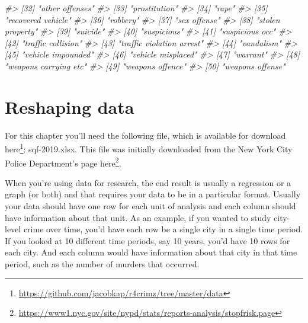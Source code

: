 \documentclass[
]{krantz}
\makeatletter
\newenvironment{Shaded}{\begin{snugshade}}{\end{snugshade}}
\newcommand{\CommentTok}[1]{\textcolor[rgb]{0.37,0.37,0.37}{\textit{#1}}}
\renewcommand{\href}[2]{#2\footnote{\url{#1}}}
\newenvironment{kframe}{%
\medskip{}
\setlength{\fboxsep}{.8em}
 \def\at@end@of@kframe{}%
 \ifinner\ifhmode%
  \def\at@end@of@kframe{\end{minipage}}%
  \begin{minipage}{\columnwidth}%
 \fi\fi%
 \def\FrameCommand##1{\hskip\@totalleftmargin \hskip-\fboxsep
 \colorbox{shadecolor}{##1}\hskip-\fboxsep
     \hskip-\linewidth \hskip-\@totalleftmargin \hskip\columnwidth}%
 \MakeFramed {\advance\hsize-\width
   \@totalleftmargin\z@ \linewidth\hsize
   \@setminipage}}%
 {\par\unskip\endMakeFramed%
 \at@end@of@kframe}
\renewenvironment{Shaded}{\begin{kframe}}{\end{kframe}}
\makeatother
\begin{document}
\begin{Shaded}
\begin{Highlighting}[]
\CommentTok{\#\textgreater{} [32] "other offenses"                            }
\CommentTok{\#\textgreater{} [33] "prostitution"                              }
\CommentTok{\#\textgreater{} [34] "rape"                                      }
\CommentTok{\#\textgreater{} [35] "recovered vehicle"                         }
\CommentTok{\#\textgreater{} [36] "robbery"                                   }
\CommentTok{\#\textgreater{} [37] "sex offense"                               }
\CommentTok{\#\textgreater{} [38] "stolen property"                           }
\CommentTok{\#\textgreater{} [39] "suicide"                                   }
\CommentTok{\#\textgreater{} [40] "suspicious"                                }
\CommentTok{\#\textgreater{} [41] "suspicious occ"                            }
\CommentTok{\#\textgreater{} [42] "traffic collision"                         }
\CommentTok{\#\textgreater{} [43] "traffic violation arrest"                  }
\CommentTok{\#\textgreater{} [44] "vandalism"                                 }
\CommentTok{\#\textgreater{} [45] "vehicle impounded"                         }
\CommentTok{\#\textgreater{} [46] "vehicle misplaced"                         }
\CommentTok{\#\textgreater{} [47] "warrant"                                   }
\CommentTok{\#\textgreater{} [48] "weapons carrying etc"                      }
\CommentTok{\#\textgreater{} [49] "weapons offence"                           }
\CommentTok{\#\textgreater{} [50] "weapons offense"}
\end{Highlighting}
\end{Shaded}

\hypertarget{reshaping}{%
\chapter{Reshaping data}\label{reshaping}}

For this chapter you'll need the following file, which is
available for download
\href{https://github.com/jacobkap/r4crimz/tree/master/data}{here}:
sqf-2019.xlsx. This file was initially downloaded from the
New York City Police Department's page
\href{https://www1.nyc.gov/site/nypd/stats/reports-analysis/stopfrisk.page}{here}.

When you're using data for research, the end result is
usually a regression or a graph (or both) and that requires
your data to be in a particular format. Usually your data
should have one row for each unit of analysis and each
column should have information about that unit. As an
example, if you wanted to study city-level crime over time,
you'd have each row be a single city in a single time
period. If you looked at 10 different time periods, say 10
years, you'd have 10 rows for each city. And each column
would have information about that city in that time period,
such as the number of murders that occurred.
\end{document}
